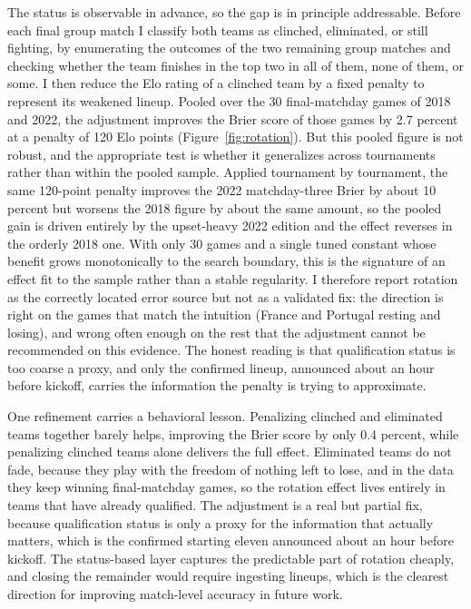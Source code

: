 \documentclass[11pt,letterpaper]{article}
\begin{document}
The status is observable in advance, so the gap is in principle addressable. Before each final group match I classify both teams as clinched, eliminated, or still fighting, by enumerating the outcomes of the two remaining group matches and checking whether the team finishes in the top two in all of them, none of them, or some. I then reduce the Elo rating of a clinched team by a fixed penalty to represent its weakened lineup. Pooled over the 30 final-matchday games of 2018 and 2022, the adjustment improves the Brier score of those games by 2.7 percent at a penalty of 120 Elo points (Figure~\ref{fig:rotation}). But this pooled figure is not robust, and the appropriate test is whether it generalizes across tournaments rather than within the pooled sample. Applied tournament by tournament, the same 120-point penalty improves the 2022 matchday-three Brier by about 10 percent but worsens the 2018 figure by about the same amount, so the pooled gain is driven entirely by the upset-heavy 2022 edition and the effect reverses in the orderly 2018 one. With only 30 games and a single tuned constant whose benefit grows monotonically to the search boundary, this is the signature of an effect fit to the sample rather than a stable regularity. I therefore report rotation as the correctly located error source but not as a validated fix: the direction is right on the games that match the intuition (France and Portugal resting and losing), and wrong often enough on the rest that the adjustment cannot be recommended on this evidence. The honest reading is that qualification status is too coarse a proxy, and only the confirmed lineup, announced about an hour before kickoff, carries the information the penalty is trying to approximate.

One refinement carries a behavioral lesson. Penalizing clinched and eliminated teams together barely helps, improving the Brier score by only 0.4 percent, while penalizing clinched teams alone delivers the full effect. Eliminated teams do not fade, because they play with the freedom of nothing left to lose, and in the data they keep winning final-matchday games, so the rotation effect lives entirely in teams that have already qualified. The adjustment is a real but partial fix, because qualification status is only a proxy for the information that actually matters, which is the confirmed starting eleven announced about an hour before kickoff. The status-based layer captures the predictable part of rotation cheaply, and closing the remainder would require ingesting lineups, which is the clearest direction for improving match-level accuracy in future work.
\end{document}
